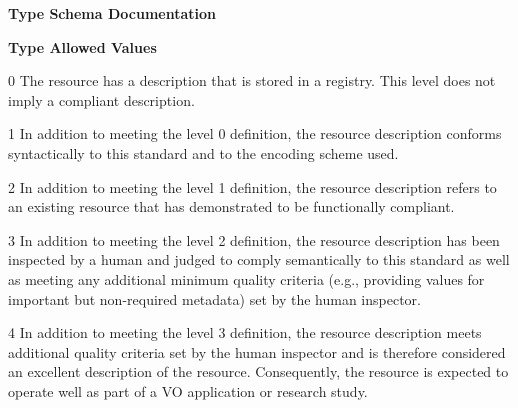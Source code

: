 \documentclass[11pt,a4paper]{ivoa}
\begin{document}
\begin{generated}
\begingroup
        \renewcommand*\descriptionlabel[1]{%
        \hbox to 5.5em{\emph{#1}\hfil}}\vspace{2ex}\noindent\textbf{ Type Schema Documentation}



\vspace{2ex}\noindent\textbf{ Type Allowed Values}

\begin{longtermsdescription}\item[0]
              The resource has a description that is stored in a
              registry. This level does not imply a compliant
              description.

\item[1]
              In addition to meeting the level 0 definition, the
              resource description conforms syntactically to this
              standard and to the encoding scheme used.

\item[2]
              In addition to meeting the level 1 definition, the
              resource description refers to an existing resource that
              has demonstrated to be functionally compliant.

\item[3]
              In addition to meeting the level 2 definition, the
              resource description has been inspected by a human and
              judged to comply semantically to this standard as well
              as meeting any additional minimum quality criteria (e.g.,
              providing values for important but non-required
              metadata) set by the human inspector.

\item[4]
              In addition to meeting the level 3 definition, the
              resource description meets additional quality criteria
              set by the human inspector and is therefore considered
              an excellent description of the resource. Consequently,
              the resource is expected to operate well as part of a
              VO application or research study.


\end{longtermsdescription}
\end{generated}
\end{document}

